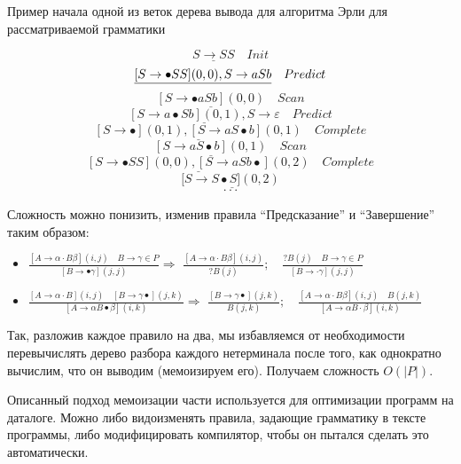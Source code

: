 \begin{example} Пример начала одной из веток дерева вывода для алгоритма Эрли для рассматриваемой грамматики
	
	$$\underline{S \rightarrow SS} \quad Init$$
	$$\underline{[S \rightarrow \bullet SS](0,0), \space S \rightarrow aSb} \quad Predict$$
	$$\underline{[S \rightarrow \bullet aSb](0,0)} \quad Scan$$
	$$\underline{[S \rightarrow a \bullet Sb](0,1), S \rightarrow \varepsilon} \quad Predict$$
	$$\underline{[S \rightarrow \bullet](0, 1), [S \rightarrow aS \bullet b](0,1)} \quad Complete$$
	$$\underline{[S \rightarrow aS \bullet b](0,1)} \quad Scan$$
	$$\underline{[S \rightarrow \bullet SS](0,0),[S \rightarrow aSb \bullet](0,2)} \quad Complete$$
	$$[\underline{S \rightarrow S \bullet S](0,2)}$$
	$$\cdot\cdot\cdot$$
	
\end{example}

Сложность можно понизить, изменив правила ``Предсказание'' и ``Завершение'' таким образом:
\begin{itemize}
	\item $\frac{[A \rightarrow \alpha \cdot B \beta](i, j) \quad B \rightarrow \gamma \in P}{[B \rightarrow \bullet \gamma](j, j)} \Rightarrow$ $
	\frac{[A \rightarrow \alpha \cdot B \beta](i, j)}{? B(j)}; \quad \frac{? B(j) \quad B \rightarrow \gamma \in P}{[B \rightarrow \cdot \gamma](j, j)}$
	\item $\frac{[A \rightarrow \alpha \cdot B](i, j) \quad[B \rightarrow \gamma \bullet](j, k)}{[A \rightarrow \alpha B \bullet \beta](i, k)} \Rightarrow$ $\frac{[B \rightarrow \gamma \bullet](j, k)}{B(j, k)}; \quad \frac{[A \rightarrow \alpha \cdot B \beta](i, j) \quad B(j, k)}{[A \rightarrow \alpha B \cdot \beta](i, k)}$
\end{itemize}
Так, разложив каждое правило на два, мы избавляемся от необходимости перевычислять дерево разбора каждого нетерминала после того, как однократно вычислим, что он выводим (мемоизируем его). Получаем сложность $O(|P|)$.

Описанный подход мемоизации\cite{Magic} части используется для оптимизации программ на даталоге. Можно либо видоизменять правила, задающие грамматику в тексте программы, либо модифицировать компилятор, чтобы он пытался сделать это автоматически. 